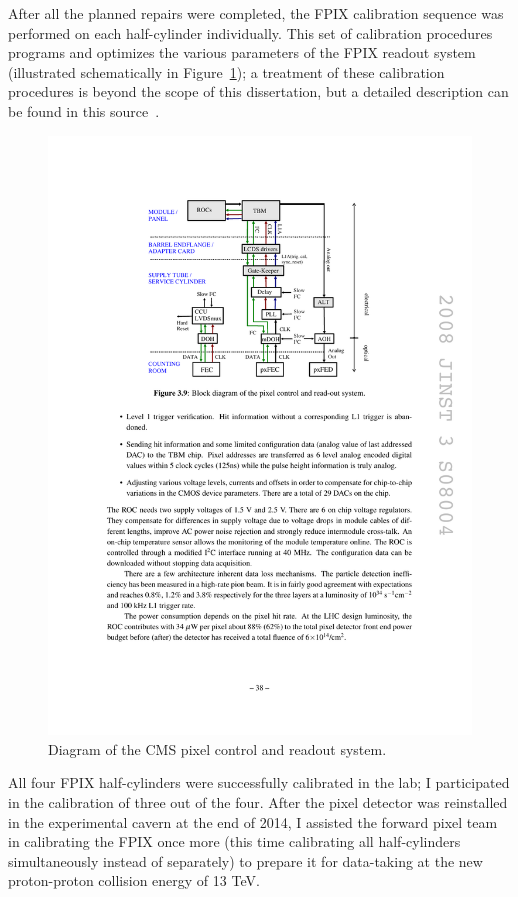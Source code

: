 After all the planned repairs were completed, the FPIX calibration sequence was performed on each half-cylinder individually. This set of calibration procedures programs and optimizes the various parameters of the FPIX readout system (illustrated schematically in Figure~\ref{fig:cms-pixel-readout}); a treatment of these calibration procedures is beyond the scope of this dissertation, but a detailed description can be found in this source~\cite{CMS-pixel-calibrations}.

\begin{figure}[hbtp]
  \begin{center}
    \includegraphics[width=2.0\cmsFigWidth]{figures/cms-pixel-readout}
    \caption{Diagram of the CMS pixel control and readout system. ~\cite{1748-0221-3-08-S08004}}
    \label{fig:cms-pixel-readout}
  \end{center}
\end{figure}

All four FPIX half-cylinders were successfully calibrated in the lab; I participated in the calibration of three out of the four. After the pixel detector was reinstalled in the experimental cavern at the end of 2014, I assisted the forward pixel team in calibrating the FPIX once more (this time calibrating all half-cylinders simultaneously instead of separately) to prepare it for data-taking at the new proton-proton collision energy of 13 TeV.